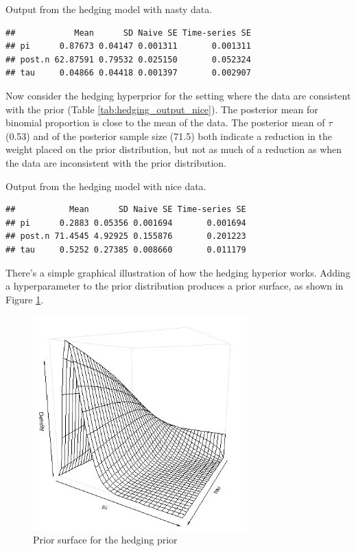 \documentclass[12pt]{article}
\begin{document}
\linespread{1}
\begin{table}
\caption{Output from the hedging model with nasty data.  \label{tab:hedging_output_nasty}}
\begin{verbatim}
##            Mean      SD Naive SE Time-series SE
## pi      0.87673 0.04147 0.001311       0.001311
## post.n 62.87591 0.79532 0.025150       0.052324
## tau     0.04866 0.04418 0.001397       0.002907
\end{verbatim}
\end{table}

Now consider the hedging hyperprior for the setting where the data are consistent with the prior (Table  \ref{tab:hedging_output_nice}). The posterior mean for binomial proportion is close to the mean of the data. The posterior mean of $\tau$ (0.53) and of the posterior sample size (71.5) both indicate a reduction in the weight placed on the prior distribution, but not as much of a reduction as when the data are inconsistent with the prior distribution. 

\linespread{1.6}


\linespread{1}

\begin{table}
\caption{Output from the hedging model with nice data.  \label{tab:hedging_output_nice}}
\begin{verbatim}
##           Mean      SD Naive SE Time-series SE
## pi      0.2883 0.05356 0.001694       0.001694
## post.n 71.4545 4.92925 0.155876       0.201223
## tau     0.5252 0.27385 0.008660       0.011179
\end{verbatim}
\end{table}

\linespread{1.6}

There's a simple graphical illustration of how the hedging hyperior works. Adding a hyperparameter to the prior distribution produces a prior surface, as shown in Figure \ref{fig:hedging_surface}.

\begin{figure}
\begin{center}
\includegraphics[width=3.25in]{fig3.png}
\end{center}
\caption{Prior surface for the hedging prior \label{fig:hedging_surface}}
\end{figure}
\end{document}
